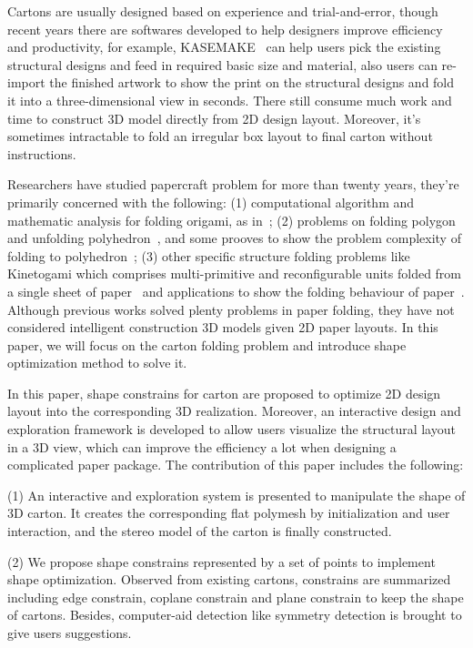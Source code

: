\documentclass[submission]{gmp2018}
\begin{document}
Cartons are usually designed based on experience and trial-and-error, though recent years there are softwares developed to help designers improve efficiency and productivity, for example, KASEMAKE~\cite{KASEMAKE} can help users pick the existing structural designs and feed in required basic size and material, also users can re-import the finished artwork to show the print on the structural designs and fold it into a three-dimensional view in seconds. There still consume much work and time to construct 3D model directly from 2D design layout. Moreover, it's sometimes intractable to fold an irregular box layout to final carton without instructions.

Researchers have studied papercraft problem for more than twenty years, they're primarily concerned with the following: (1) computational algorithm and mathematic analysis for folding origami, as in~\cite{Ida:2007:MOC:1802954.1803021,Lang:1996:CAO:237218.237249,xl-idetc-14}; (2) problems on folding polygon and unfolding polyhedron~\cite{Bern:2003:UPC:636968.636970,O'Rourke:1998:FUC:646319.686376,Rourke2008Unfolding}, and some prooves to show the problem complexity of folding to polyhedron~\cite{Biedl:2005:NFP:1090462.1646553,Biedl2004When,Lubiw1996When}; (3) other specific structure folding problems like Kinetogami which comprises multi-primitive and reconfigurable units folded from a single sheet of paper~\cite{Gao2013Kinetogami} and applications to show the folding behaviour of paper~\cite{Thiel1998,Kishi:1998:OFP:786112.786279,Nimnual2007Virtual,Shimanuki2009Construction}. Although previous works solved plenty problems in paper folding, they have not considered intelligent construction 3D models given 2D paper layouts. In this paper, we will focus on the carton folding problem and introduce shape optimization method to solve it.

In this paper, shape constrains for carton are proposed to optimize 2D design layout into the corresponding 3D realization. Moreover, an interactive design and exploration framework is developed to allow users visualize the structural layout in a 3D view, which can improve the efficiency a lot when designing a complicated paper package. The contribution of this paper includes the following:

(1) An interactive and exploration system is presented to manipulate the shape of 3D carton. It creates the corresponding flat polymesh by initialization and user interaction, and the stereo model of the carton is finally constructed.

(2) We propose shape constrains represented by a set of points to implement shape optimization. Observed from existing cartons,  constrains are summarized including edge constrain, coplane constrain and plane constrain to keep the shape of cartons. Besides, computer-aid detection like symmetry detection is brought to give users suggestions. 
\end{document}
